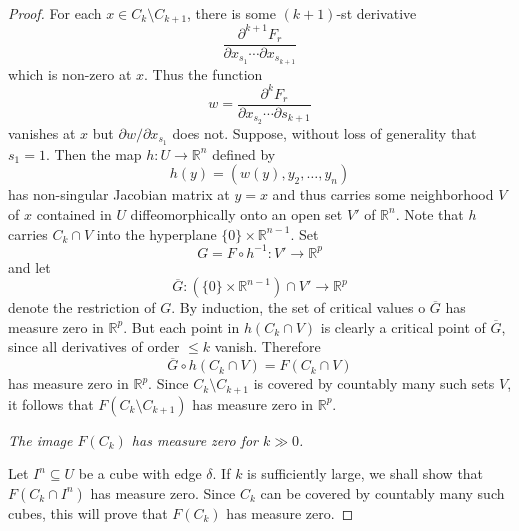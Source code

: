 \documentclass[11pt]{article}
\theoremstyle{thmstyle}
\theoremstyle{defstyle}
\newcommand{\R}{\mathbb{R}}
\renewcommand{\le}{\leqslant}
\begin{document}
\begin{proof}
	For each $x\in C_k\setminus C_{k + 1}$, there is some $(k + 1)$-st derivative 
	\begin{equation*}
		\frac{\partial^{k + 1} F_r}{\partial x_{s_1}\cdots\partial x_{s_{k + 1}}}
	\end{equation*}
	which is non-zero at $x$. Thus the function 
	\begin{equation*}
		w = \frac{\partial^k F_r}{\partial x_{s_2}\cdots\partial s_{k + 1}}
	\end{equation*}
	vanishes at $x$ but $\partial w/\partial x_{s_1}$ does not. Suppose, without loss of generality that $s_1 = 1$. Then the map $h\colon U\to\R^n$ defined by 
	\begin{equation*}
		h(y) = \left(w(y), y_2,\dots,y_n\right)
	\end{equation*}
	has non-singular Jacobian matrix at $y = x$ and thus carries some neighborhood $V$ of $x$ contained in $U$ diffeomorphically onto an open set $V'$ of $\R^n$. Note that $h$ carries $C_k\cap V$ into the hyperplane $\{0\}\times\R^{n - 1}$. Set 
	\begin{equation*}
		G = F\circ h^{-1}\colon V'\to\R^p
	\end{equation*}
	and let 
	\begin{equation*}
		\overline G\colon\left(\{0\}\times\R^{n - 1}\right)\cap V'\to\R^p
	\end{equation*}
	denote the restriction of $G$. By  induction, the set of critical values o $\overline G$ has measure zero in $\R^p$. But each point in $h(C_k\cap V)$ is clearly a critical point of $\overline G$, since all derivatives of order $\le k$ vanish. Therefore 
	\begin{equation*}
		\overline G\circ h\left(C_k\cap V\right) = F(C_k\cap V)
	\end{equation*}
	has measure zero in $\R^p$. Since $C_k\setminus C_{k + 1}$ is covered by countably many such sets $V$, it follows that $F(C_k\setminus C_{k + 1})$ has measure zero in $\R^p$.

	 \emph{The image $F(C_k)$ has measure zero for $k\gg 0$.}

	Let $I^n\subseteq U$ be a cube with edge $\delta$. If $k$ is sufficiently large, we shall show that $F(C_k\cap I^n)$ has measure zero. Since $C_k$ can be covered by countably many such cubes, this will prove that $F(C_k)$ has measure zero.


\end{proof}
\end{document}
